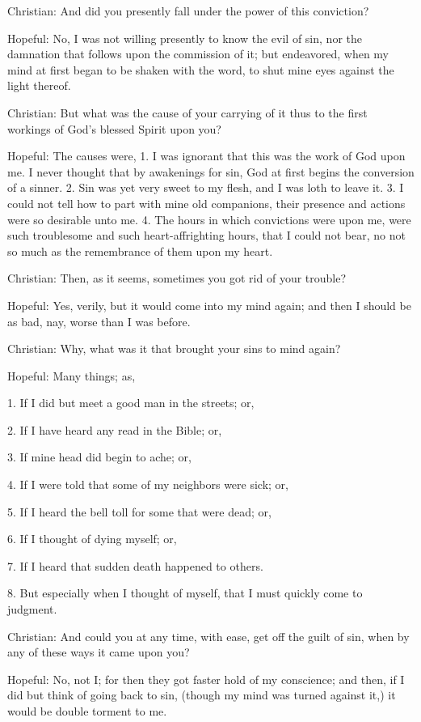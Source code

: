 Christian: And did you presently fall under the power of this conviction?

Hopeful: No, I was not willing presently to know the evil of sin, nor the damnation that follows upon the commission of it; but endeavored, when my mind at first began to be shaken with the word, to shut mine eyes against the light thereof.

Christian: But what was the cause of your carrying of it thus to the first workings of God's blessed Spirit upon you?

Hopeful: The causes were, 1. I was ignorant that this was the work of God upon me. I never thought that by awakenings for sin, God at first begins the conversion of a sinner. 2. Sin was yet very sweet to my flesh, and I was loth to leave it. 3. I could not tell how to part with mine old companions, their presence and actions were so desirable unto me. 4. The hours in which convictions were upon me, were such troublesome and such heart-affrighting hours, that I could not bear, no not so much as the remembrance of them upon my heart.

Christian: Then, as it seems, sometimes you got rid of your trouble?

Hopeful: Yes, verily, but it would come into my mind again; and then I should be as bad, nay, worse than I was before.

Christian: Why, what was it that brought your sins to mind again?

Hopeful: Many things; as,

1. If I did but meet a good man in the streets; or,

2. If I have heard any read in the Bible; or,

3. If mine head did begin to ache; or,

4. If I were told that some of my neighbors were sick; or,

5. If I heard the bell toll for some that were dead; or,

6. If I thought of dying myself; or,

7. If I heard that sudden death happened to others.

8. But especially when I thought of myself, that I must quickly come to judgment.

Christian: And could you at any time, with ease, get off the guilt of sin, when by any of these ways it came upon you?

Hopeful: No, not I; for then they got faster hold of my conscience; and then, if I did but think of going back to sin, (though my mind was turned against it,) it would be double torment to me.

